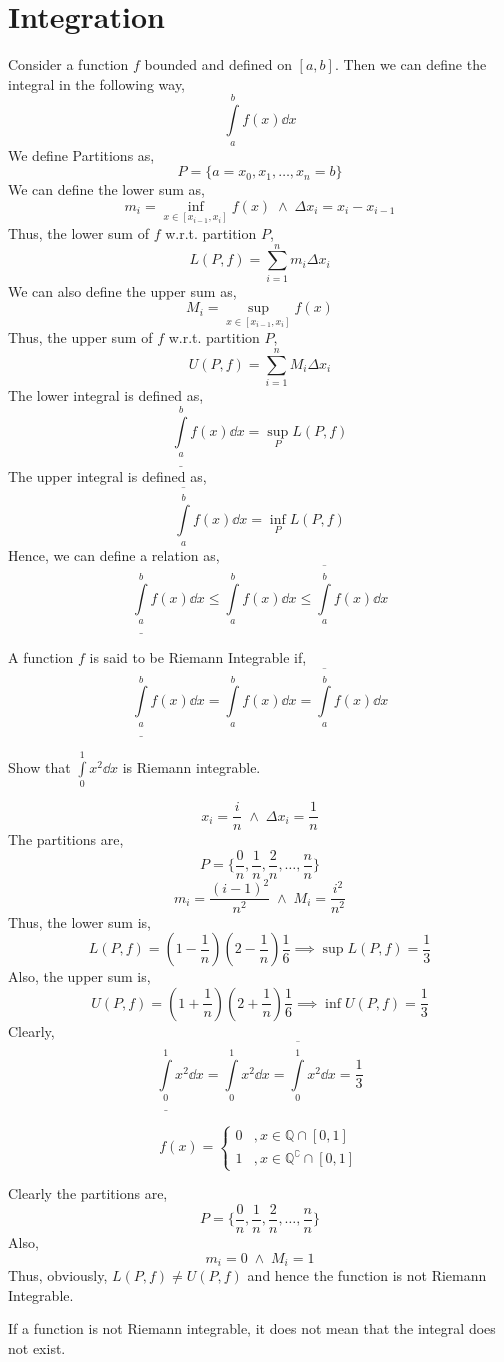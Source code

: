 \section{Integration}
Consider a function $f$ bounded and defined on $[a,b]$. Then we can define the integral in the following way,
\[\int\limits_a^b f(x)\dd{x}\]
We define Partitions as,
\[P=\{ a=x_0, x_1,\ldots, x_n=b \}\]
We can define the lower sum as,
\[m_i=\inf_{x\in [x_{i-1},x_i]}f(x) \; \land \; \Delta x_i=x_i-x_{i-1}\]
Thus, the lower sum of $f$ w.r.t. partition $P$,
\[L(P,f)=\sum\limits_{i=1}^n m_i\Delta x_i\]
We can also define the upper sum as,
\[M_i=\sup_{x\in [x_{i-1},x_i]}f(x)\]
Thus, the upper sum of $f$ w.r.t. partition $P$,
\[U(P,f)=\sum\limits_{i=1}^n M_i\Delta x_i\]
The lower integral is defined as,
\[\underline{\int\limits_a^b}f(x)\dd{x}=\sup_P L(P,f)\]
The upper integral is defined as,
\[\overline{\int\limits_a^b}f(x)\dd{x}=\inf_P L(P,f)\]
Hence, we can define a relation as,
\[\underline{\int\limits_a^b}f(x)\dd{x}\leq \int\limits_a^b f(x)\dd{x} \leq \overline{\int\limits_a^b}f(x)\dd{x}\]
\begin{theorem}
	A function $f$ is said to be Riemann Integrable if,
	\[\underline{\int\limits_a^b}f(x)\dd{x}= \int\limits_a^b f(x)\dd{x} = \overline{\int\limits_a^b}f(x)\dd{x}\]
\end{theorem}
\begin{eg}
	Show that $\int\limits_0^1 x^2\dd{x}$ is Riemann integrable.
\end{eg}
\begin{explanation}
	\[x_i=\frac{i}{n}\; \land \; \Delta x_i=\frac{1}{n}\]
	The partitions are,
	\[P=\{\frac{0}{n}, \frac{1}{n}, \frac{2}{n},\ldots, \frac{n}{n}\}\]
	\[m_i=\frac{(i-1)^2}{n^2} \; \land \; M_i=\frac{i^2}{n^2}\]
	Thus, the lower sum is,
	\[L(P,f)=\left(1-\frac{1}{n}\right)\left(2-\frac{1}{n}\right)\frac{1}{6}\implies \sup L(P,f)=\frac{1}{3}\]
	Also, the upper sum is,
	\[U(P,f)=\left(1+\frac{1}{n}\right)\left(2+\frac{1}{n}\right)\frac{1}{6}\implies \inf U(P,f)=\frac{1}{3}\]
	Clearly,
	\[\underline{\int\limits_0^1}x^2\dd{x}= \int\limits_0^1 x^2\dd{x} = \overline{\int\limits_0^1}x^2\dd{x}=\frac{1}{3}\]
\end{explanation}
\begin{eg}
	\[f(x)=\begin{cases}
		0 &, x\in \mathbb{Q}\cap [0,1]\\
		1 &, x\in\mathbb{Q}^\complement \cap [0,1]
	\end{cases}\]
\end{eg}
\begin{explanation}
	Clearly the partitions are,
	\[P=\{\frac{0}{n}, \frac{1}{n}, \frac{2}{n},\ldots, \frac{n}{n}\}\]
	Also,
	\[m_i=0 \; \land \; M_i=1\]
	Thus, obviously, $L(P,f)\neq U(P,f)$ and hence the function is not Riemann Integrable.
\end{explanation}
If a function is not Riemann integrable, it does not mean that the integral does not exist.
